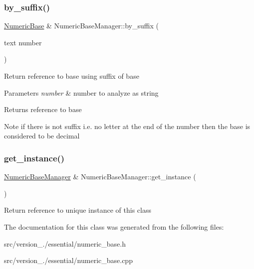 \subsubsection{\texorpdfstring{by\+\_\+suffix()}{by\_suffix()}}
{\footnotesize\ttfamily \hyperlink{classez_1_1essential_1_1NumericBase}{Numeric\+Base} \& Numeric\+Base\+Manager\+::by\+\_\+suffix (\begin{DoxyParamCaption}\item[{text}]{number }\end{DoxyParamCaption})}

Return reference to base using suffix of base 
\begin{DoxyParams}{Parameters}
{\em number} & number to analyze as string \\
\hline
\end{DoxyParams}
\begin{DoxyReturn}{Returns}
reference to base 
\end{DoxyReturn}
\begin{DoxyNote}{Note}
if there is not suffix i.\+e. no letter at the end of the number then the base is considered to be decimal 
\end{DoxyNote}
\mbox{\label{classez_1_1essential_1_1NumericBaseManager_ae0211a05efad4e04051e8ebf30ea2b7c}} 
\subsubsection{\texorpdfstring{get\+\_\+instance()}{get\_instance()}}
{\footnotesize\ttfamily \hyperlink{classez_1_1essential_1_1NumericBaseManager}{Numeric\+Base\+Manager} \& Numeric\+Base\+Manager\+::get\+\_\+instance (\begin{DoxyParamCaption}{ }\end{DoxyParamCaption})\hspace{0.3cm}{\ttfamily [static]}}

Return reference to unique instance of this class 

The documentation for this class was generated from the following files\+:\begin{DoxyCompactItemize}
\item 
src/version\+\_./essential/numeric\+\_\+base.\+h\item 
src/version\+\_./essential/numeric\+\_\+base.\+cpp\end{DoxyCompactItemize}
